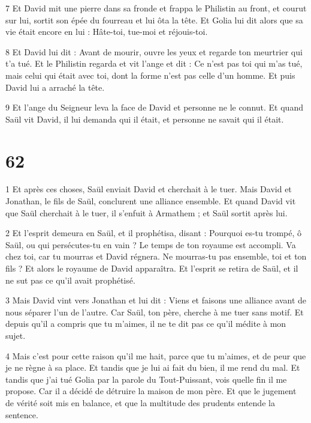 \par 7 Et David mit une pierre dans sa fronde et frappa le Philistin au front, et courut sur lui, sortit son épée du fourreau et lui ôta la tête. Et Golia lui dit alors que sa vie était encore en lui : Hâte-toi, tue-moi et réjouis-toi.

\par 8 Et David lui dit : Avant de mourir, ouvre les yeux et regarde ton meurtrier qui t'a tué. Et le Philistin regarda et vit l'ange et dit : Ce n'est pas toi qui m'as tué, mais celui qui était avec toi, dont la forme n'est pas celle d'un homme. Et puis David lui a arraché la tête.

\par 9 Et l'ange du Seigneur leva la face de David et personne ne le connut. Et quand Saül vit David, il lui demanda qui il était, et personne ne savait qui il était.

\chapter{62}

\par 1 Et après ces choses, Saül enviait David et cherchait à le tuer. Mais David et Jonathan, le fils de Saül, conclurent une alliance ensemble. Et quand David vit que Saül cherchait à le tuer, il s'enfuit à Armathem ; et Saül sortit après lui.

\par 2 Et l'esprit demeura en Saül, et il prophétisa, disant : Pourquoi es-tu trompé, ô Saül, ou qui persécutes-tu en vain ? Le temps de ton royaume est accompli. Va chez toi, car tu mourras et David régnera. Ne mourras-tu pas ensemble, toi et ton fils ? Et alors le royaume de David apparaîtra. Et l'esprit se retira de Saül, et il ne sut pas ce qu'il avait prophétisé.

\par 3 Mais David vint vers Jonathan et lui dit : Viens et faisons une alliance avant de nous séparer l'un de l'autre. Car Saül, ton père, cherche à me tuer sans motif. Et depuis qu'il a compris que tu m'aimes, il ne te dit pas ce qu'il médite à mon sujet.

\par 4 Mais c'est pour cette raison qu'il me hait, parce que tu m'aimes, et de peur que je ne règne à sa place. Et tandis que je lui ai fait du bien, il me rend du mal. Et tandis que j'ai tué Golia par la parole du Tout-Puissant, vois quelle fin il me propose. Car il a décidé de détruire la maison de mon père. Et que le jugement de vérité soit mis en balance, et que la multitude des prudents entende la sentence.

